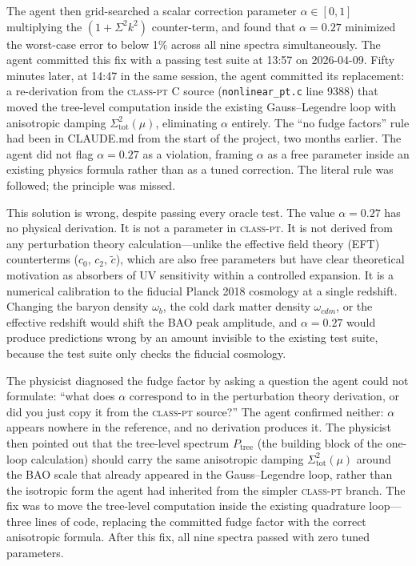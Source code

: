 \documentclass{article}
\newcommand{\classpt}{\textsc{class-pt}\xspace}
\begin{document}
The agent then grid-searched a scalar correction parameter $\alpha \in [0,1]$ multiplying the $(1+\Sigma^2 k^2)$ counter-term, and found that $\alpha = 0.27$ minimized the worst-case error to below 1\% across all nine spectra simultaneously. The agent committed this fix with a passing test suite at 13:57 on 2026-04-09. Fifty minutes later, at 14:47 in the same session, the agent committed its replacement: a re-derivation from the \classpt C source (\texttt{nonlinear\_pt.c} line 9388) that moved the tree-level computation inside the existing Gauss--Legendre loop with anisotropic damping $\Sigma^2_\mathrm{tot}(\mu)$, eliminating $\alpha$ entirely. The ``no fudge factors'' rule had been in CLAUDE.md from the start of the project, two months earlier. The agent did not flag $\alpha=0.27$ as a violation, framing $\alpha$ as a free parameter inside an existing physics formula rather than as a tuned correction. The literal rule was followed; the principle was missed.

This solution is wrong, despite passing every oracle test. The value $\alpha = 0.27$ has no physical derivation. It is not a parameter in \classpt. It is not derived from any perturbation theory calculation---unlike the effective field theory (EFT) counterterms ($c_0$, $c_2$, $\tilde{c}$), which are also free parameters but have clear theoretical motivation as absorbers of UV sensitivity within a controlled expansion. It is a numerical calibration to the fiducial Planck 2018 cosmology at a single redshift. Changing the baryon density $\omega_b$, the cold dark matter density $\omega_{cdm}$, or the effective redshift would shift the BAO peak amplitude, and $\alpha = 0.27$ would produce predictions wrong by an amount invisible to the existing test suite, because the test suite only checks the fiducial cosmology.

The physicist diagnosed the fudge factor by asking a question the agent could not formulate: ``what does $\alpha$ correspond to in the perturbation theory derivation, or did you just copy it from the \classpt source?'' The agent confirmed neither: $\alpha$ appears nowhere in the reference, and no derivation produces it. The physicist then pointed out that the tree-level spectrum $P_\mathrm{tree}$ (the building block of the one-loop calculation) should carry the same anisotropic damping $\Sigma^2_\mathrm{tot}(\mu)$ around the BAO scale that already appeared in the Gauss--Legendre loop, rather than the isotropic form the agent had inherited from the simpler \classpt branch. The fix was to move the tree-level computation inside the existing quadrature loop---three lines of code, replacing the committed fudge factor with the correct anisotropic formula. After this fix, all nine spectra passed with zero tuned parameters.
\end{document}
